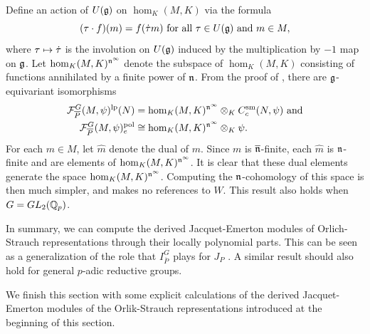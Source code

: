 \documentclass[10pt]{amsart}
\begin{document}
Define an action of $U(\mathfrak{g})$ on $\hom_{K}(M,K)$ via the formula \[
    (\tau \cdot f)(m)=f(\dot{\tau}m) \textnormal{ for all } \tau \in U(\mathfrak{g}) \textnormal{ and } m\in M,
\] where $\tau\mapsto \dot{\tau}$ is the involution on $U(\mathfrak{g})$ induced by the multiplication by $-1$ map on $\mathfrak{g}$. Let $\hom_{K}(M,K)^{\mathfrak{n}^{\infty}}$ denote the subspace of $\hom_{K}(M,K)$ consisting of functions annihilated by a finite power of $\mathfrak{n}$.  From the proof of \cite[Prop. 4.2]{Breuil_socle2}, there are $\mathfrak{g}$-equivariant isomorphisms \begin{align}\begin{split}\label{eq:Breuil_N-functions}
    \mathcal{F}_{\overline{P}}^{G}(M,\psi)^{\textnormal{lp}}(N) &= \hom_{K}(M,K)^{\mathfrak{n}^{\infty}}\otimes_{K}C_{c}^{\text{sm}}(N,\psi) \textnormal{ and} \\
    \mathcal{F}_{\overline{P}}^{G}(M,\psi)^{\textnormal{pol}}_{e} &\cong \hom_{K}(M,K)^{\mathfrak{n}^{\infty}}\otimes_{K}\psi.
\end{split}\end{align} 
For each $m\in M$, let $\widehat{m}$ denote the dual of $m$. Since $m$ is $\overline{\mathfrak{n}}$-finite, each $\widehat{m}$ is $\mathfrak{n}$-finite and are elements of $\hom_{K}(M,K)^{\mathfrak{n}^{\infty}}$. It is clear that these dual elements generate the space $\hom_{K}(M,K)^{\mathfrak{n}^{\infty}}$. Computing the $\mathfrak{n}$-cohomology of this space is then much simpler, and makes no references to $W$. This result also holds when $G=GL_{2}(\mathbb{Q}_{p})$. 

In summary, we can compute the derived Jacquet-Emerton modules of Orlich-Strauch representations through their locally polynomial parts. This can be seen as a generalization of the role that $I_{\overline{P}}^{G}$ plays for $J_P$ \cite{Jacquet2}. A similar result should also hold for general $p$-adic reductive groups. 

We finish this section with some explicit calculations of the derived Jacquet-Emerton modules of the Orlik-Strauch representations introduced at the beginning of this section.
\end{document}

